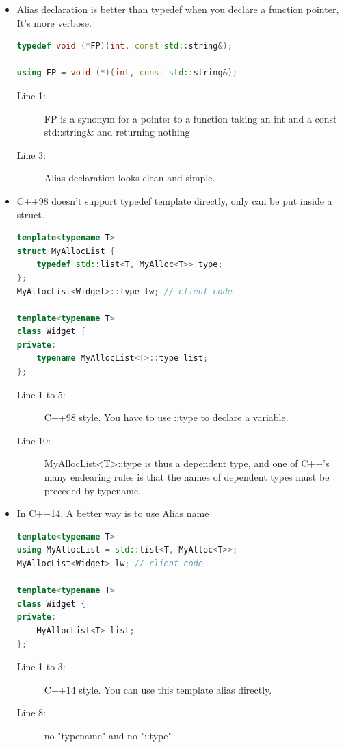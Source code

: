 \documentclass[a4paper,11pt,twoside]{book}
\begin{document}
\begin{itemize}
\item Alias declaration is better than typedef when you declare a function pointer, It's more verbose.
\begin{lstlisting}[frame=single, language=c++]
typedef void (*FP)(int, const std::string&);

using FP = void (*)(int, const std::string&);
\end{lstlisting}
\begin{description}
	\item[Line 1:] FP is a synonym for a pointer to a function taking an int and a const std::string\& and returning nothing
	\item[Line 3:] Alias declaration looks clean and simple.
\end{description}

\item C++98 doesn't support typedef template directly, only can be put inside a struct.
\begin{lstlisting}[frame=single, language=c++]
template<typename T>
struct MyAllocList {
	typedef std::list<T, MyAlloc<T>> type;
};
MyAllocList<Widget>::type lw; // client code

template<typename T>
class Widget { 
private:
	typename MyAllocList<T>::type list; 
};
\end{lstlisting}
\begin{description}
	\item[Line 1 to 5:] C++98 style. You have to use ::type to declare a variable.
	\item[Line 10:] MyAllocList<T>::type is thus a dependent type, and one of C++'s many endearing rules is that the names of dependent types must be preceded by typename.
\end{description}


\item In C++14, A better way is to use Alias name
\begin{lstlisting}[frame=single, language=c++]
template<typename T> 
using MyAllocList = std::list<T, MyAlloc<T>>;
MyAllocList<Widget> lw; // client code

template<typename T>
class Widget {
private:
	MyAllocList<T> list; 
};
\end{lstlisting}


\begin{description}
	\item[Line 1 to 3:] C++14 style. You can use this template alias directly.
	\item[Line 8:] no "typename" and no "::type"
\end{description}


\end{itemize}
\end{document}
